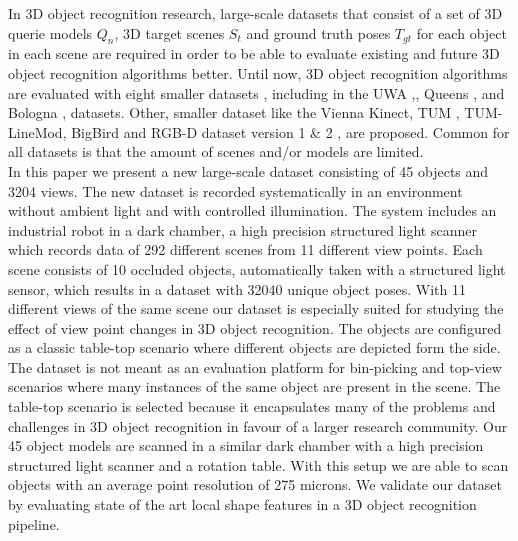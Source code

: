 \documentclass[10pt,twocolumn,letterpaper]{article}
\begin{document}
In 3D object recognition research, large-scale datasets that consist of a set of 3D querie models $Q_n$, 3D target scenes $S_t$ and ground truth poses $T_{gt}$ for each object in each scene are required in order to be able to evaluate existing and future 3D object recognition algorithms better. Until now, 3D object recognition algorithms are evaluated with eight smaller datasets \cite{Guo2015}, including in the UWA \cite{Mian2006},\cite{Mian2010}, Queens \cite{Taati2007},\cite{Taati2007} and Bologna \cite{Salti2014},\cite{Tombari2010} datasets. Other, smaller dataset like the Vienna Kinect\cite{Aldoma2012}, TUM \cite{Rodola2013}, TUM-LineMod\cite{Hinterstoisser2012}, BigBird\cite{BigBIRD} and RGB-D dataset version 1 \& 2 \cite{Lai2011},\cite{Lai2014} are proposed. Common for all datasets is that the amount of scenes and/or models are limited.\\
\indent In this paper we present a new large-scale dataset consisting of 45 objects and 3204 views. The new dataset is recorded systematically in an environment without ambient light and with controlled illumination. The system includes an industrial robot in a dark chamber, a high precision structured light scanner which records data of 292 different scenes from 11 different view points. Each scene consists of 10 occluded objects, automatically taken with a structured light sensor, which results in a dataset with 32040 unique object poses. With 11 different views of the same scene our dataset is especially suited for studying the effect of view point changes in 3D object recognition. The objects are configured as a classic table-top scenario where different objects are depicted form the side. The dataset is not meant as an evaluation platform for bin-picking and top-view scenarios where many instances of the same object are present in the scene. The table-top scenario is selected because it encapsulates many of the problems and challenges in 3D object recognition in favour of a larger research community.
Our 45 object models are scanned in a similar dark chamber with a high precision structured light scanner and a rotation table. With this setup we are able to scan objects with an average point resolution of 275 microns. We validate our dataset by evaluating state of the art local shape features in a 3D object recognition pipeline.\\ 
\end{document}

